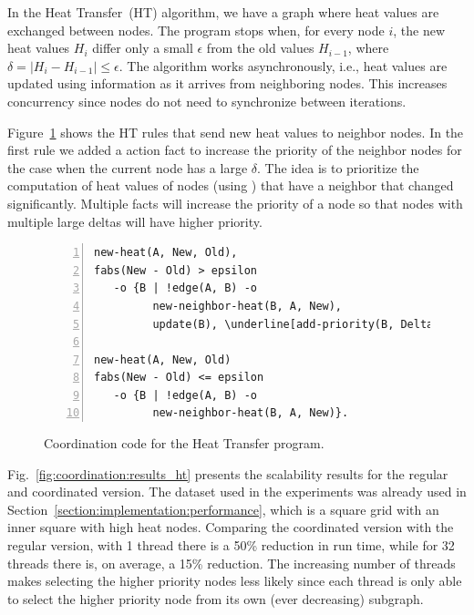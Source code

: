 In the Heat Transfer~(HT) algorithm, we have a graph where heat values are
exchanged between nodes. The program stops when, for every node $i$, the new heat values $H_i$
differ only a small $\epsilon$ from the old values $H_{i-1}$, where $\delta =
|H_i - H_{i-1}| \le \epsilon$. The algorithm works asynchronously, i.e., heat
values are updated using information as it arrives from neighboring nodes. This
increases concurrency since nodes do not need to synchronize between
iterations.

Figure~\ref{code:coord:ht} shows the HT rules that send new heat values to
neighbor nodes. In the first rule we added a  action fact to
increase the priority of the neighbor nodes for the case when the current node
has a large $\delta$. The idea is to prioritize the computation of heat values
of nodes (using ) that have a neighbor that changed significantly.
Multiple  facts will increase the priority of a node so that
nodes with multiple large deltas will have higher priority.

\begin{figure}[h!]
\begin{Verbatim}[numbers=left,fontsize=\codesize,commandchars=\\\[\]]
new-heat(A, New, Old),
fabs(New - Old) > epsilon
   -o {B | !edge(A, B) -o
         new-neighbor-heat(B, A, New),
         update(B), \underline[add-priority(B, Delta)]}.

new-heat(A, New, Old)
fabs(New - Old) <= epsilon
   -o {B | !edge(A, B) -o
         new-neighbor-heat(B, A, New)}.
\end{Verbatim}
  \caption{Coordination code for the Heat Transfer program.}
  \label{code:coord:ht}
\end{figure}

Fig.~\ref{fig:coordination:results_ht} presents the scalability results for the
regular and coordinated version. The dataset used in the experiments was already
used in Section~\ref{section:implementation:performance}, which is a square
grid with an inner square with high heat nodes. Comparing the coordinated
version with the regular version, with 1 thread there is a 50\% reduction in run
time, while for 32 threads there is, on average, a 15\% reduction. The
increasing number of threads makes selecting the higher priority nodes less
likely since each thread is only able to select the higher priority node from
its own (ever decreasing) subgraph.

